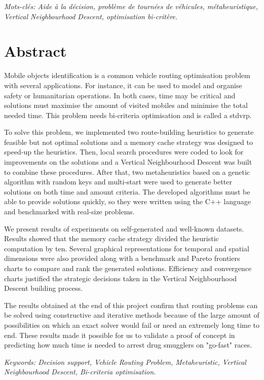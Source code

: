 \emph{Mots-clés: Aide à la décision, problème de tournées de véhicules, métaheuristique, Vertical Neighbourhood Descent, optimisation bi-critère.}

\newpage
\section*{Abstract}

Mobile objects identification is a common vehicle routing optimisation problem with several applications. For instance, it can be used to model and organise safety or humanitarian operations. In both cases, time may be critical and solutions must maximise the amount of visited mobiles and minimise the total needed time. This problem needs bi-criteria optimisation and is called a \acrlong{stdvrp}.
 
To solve this problem, we implemented two route-building heuristics to generate feasible but not optimal solutions and a memory cache strategy was designed to speed-up the heuristics. Then, local search procedures were coded to look for improvements on the solutions and a Vertical Neighbourhood Descent was built to combine these procedures. After that, two metaheuristics based on a genetic algorithm with random keys and multi-start were used to generate better solutions on both time and amount criteria. The developed algorithms must be able to provide solutions quickly, so they were written using the C++ language and benchmarked with real-size problems. 

We present results of experiments on self-generated and well-known datasets. Results showed that the memory cache strategy divided the heuristic computation by ten. Several graphical representations for temporal and spatial dimensions were also provided along with a benchmark and Pareto frontiers charts to compare and rank the generated solutions. Efficiency and convergence charts justified the strategic decisions taken in the Vertical Neighbourhood Descent building process. 

The results obtained at the end of this project confirm that routing problems can be solved using constructive and iterative methods because of the large amount of possibilities on which an exact solver would fail or need an extremely long time to end. These results made it possible for us to validate a proof of concept in predicting how much time is needed to arrest drug smugglers on "go-fast" races.

\emph{Keywords: Decision support, Vehicle Routing Problem, Metaheuristic, Vertical Neighbourhood Descent, Bi-criteria optimisation.}
